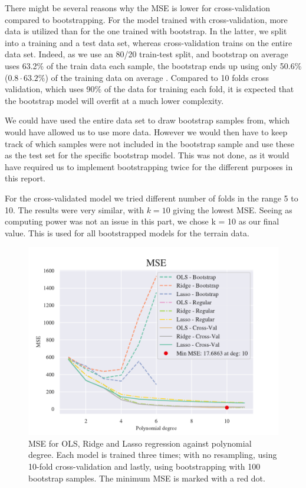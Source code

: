There might be several reasons why the MSE is lower for cross-validation compared to bootstrapping. 
For the model trained with cross-validation, more data is utilized than for the one trained with bootstrap. 
In the latter, we split into a training and a test data set, whereas cross-validation trains on the entire data set.
Indeed, as we use an 80/20 train-test split, and bootstrap on average uses 63.2\% of the train data each sample, the bootstrap ends up using only 50.6\% ($0.8\cdot 63.2\%$) of the training data on average \citep[p. 251]{hastie}. 
Compared to 10 folds cross validation, which uses 90\% of the data for training each fold, it is expected that the bootstrap model will overfit at a much lower complexity.
 
We could have used the entire data set to draw bootstrap samples from, which would have allowed us to use more data.
However we would then have to keep track of which samples were not included in the bootstrap sample and use these as the test set for the specific bootstrap model. 
This was not done, as it would have required us to implement bootstrapping twice for the different purposes in this report.

For the cross-validated model we tried different number of folds in the range 5 to 10. 
The results were very similar, with $k = 10$ giving the lowest MSE. 
Seeing as computing power was not an issue in this part, we chose k = 10 as our final value. 
This is used for all bootstrapped models for the terrain data.

\begin{figure}[h!]
    \centering
    \includegraphics[width=1\linewidth]{project_1/figures/figures_in_report/All_terrain.pdf}
    \caption{MSE for OLS, Ridge and Lasso regression against polynomial degree. Each model is trained three times; with no resampling, using 10-fold cross-validation and lastly, using bootstrapping with 100 bootstrap samples. The minimum MSE is marked with a red dot.}
    \label{all_terrain}
\end{figure}

